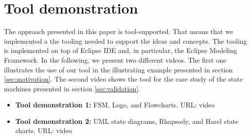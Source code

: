 \section{Tool demonstration}
\label{sec:tooldemo}

The approach presented in this paper is tool-supported. That means that we implemented a the tooling needed to support the ideas and concepts. The tooling is implemented on top of Eclipse IDE and, in particular, the Eclipse Modeling Framework. In the following, we present two different videos. The first one illustrates the use of our tool in the illustrating example presented in section \ref{sec:motivation}. The second video shows the tool for the case study of the state machines presented in section \ref{sec:validation}.

\begin{itemize}
\item \textbf{Tool demonstration 1:} FSM, Logo, and Flowcharts. URL: video

\item \textbf{Tool demonstration 2:} UML state diagrams, Rhapsody, and Harel state charts. URL: video
\end{itemize}
